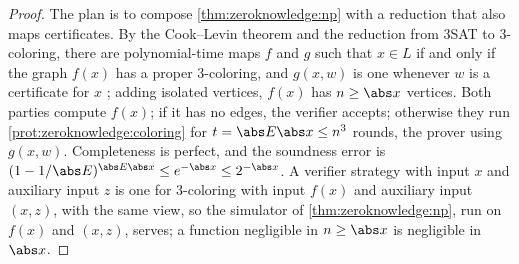 \begin{refsection}

\begin{proof}
The plan is to compose \cref{thm:zeroknowledge:np} with a reduction that also maps certificates. By the Cook--Levin theorem and the reduction from 3SAT to 3-coloring, there are polynomial-time maps $f$ and $g$ such that $x\in L$ if and only if the graph $f(x)$ has a proper 3-coloring, and $g(x,w)$ is one whenever $w$ is a certificate for $x$ \parencite[Theorem~6 and footnote~12]{GoldreichMicaliWigderson1991}; adding isolated vertices, $f(x)$ has $n\ge\abs x$ vertices. Both parties compute $f(x)$; if it has no edges, the verifier accepts; otherwise they run \cref{prot:zeroknowledge:coloring} for $t=\abs E\abs x\le n^3$ rounds, the prover using $g(x,w)$. Completeness is perfect, and the soundness error is $(1-1/\abs E)^{\abs E\abs x}\le e^{-\abs x}\le2^{-\abs x}$. A verifier strategy with input $x$ and auxiliary input $z$ is one for 3-coloring with input $f(x)$ and auxiliary input $(x,z)$, with the same view, so the simulator of \cref{thm:zeroknowledge:np}, run on $f(x)$ and $(x,z)$, serves; a function negligible in $n\ge\abs x$ is negligible in $\abs x$.
\end{proof}


\end{refsection}
